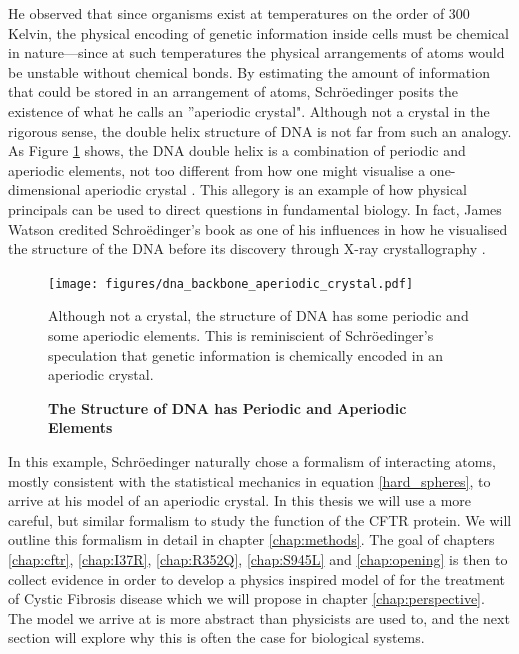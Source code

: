 He observed that since organisms exist at temperatures on the order of 300 Kelvin, the physical encoding of genetic information inside cells must be chemical in nature---since at such temperatures the physical arrangements of atoms would be unstable without chemical bonds. By estimating the amount of information that could be stored in an arrangement of atoms, Schr\"oedinger posits the existence of what he calls an ''aperiodic crystal". Although not a crystal in the rigorous sense, the double helix structure of DNA is not far from such an analogy. As Figure \ref{dna_structure} shows, the DNA double helix is a combination of periodic and aperiodic elements, not too different from how one might visualise a one-dimensional aperiodic crystal \cite{varn2016}. This allegory is an example of how physical principals can be used to direct questions in fundamental biology. In fact, James Watson credited Schro\"edinger's book as one of his influences in how he visualised the structure of the DNA before its discovery through X-ray crystallography \cite{watson2010}.

\begin{figure}
	\begin{center}
		\texttt{[image: figures/dna\_backbone\_aperiodic\_crystal.pdf]}
	\end{center}
	\captionsetup{singlelinecheck = false, justification=raggedright}
	\caption[The Structure of DNA has Periodic and Aperiodic Elements] {\textbf{The Structure of DNA has Periodic and Aperiodic Elements}}{Although not a crystal, the structure of DNA has some periodic and some aperiodic elements. This is reminiscient of Schr\"oedinger's speculation that genetic information is chemically encoded in an aperiodic crystal. }
	\label{dna_structure}
\end{figure}

In this example, Schr\"oedinger naturally chose a formalism of interacting atoms, mostly consistent with the statistical mechanics in equation \ref{hard_spheres}, to arrive at his model of an aperiodic crystal. In this thesis we will use a more careful, but similar formalism to study the function of the CFTR protein. We will outline this formalism in detail in chapter \ref{chap:methods}. The goal of chapters \ref{chap:cftr}, \ref{chap:I37R}, \ref{chap:R352Q}, \ref{chap:S945L} and \ref{chap:opening} is then to collect evidence in order to develop a physics inspired model of for the treatment of Cystic Fibrosis disease which we will propose in chapter \ref{chap:perspective}. The model we arrive at is more abstract than physicists are used to, and the next section will explore why this is often the case for biological systems.
 
